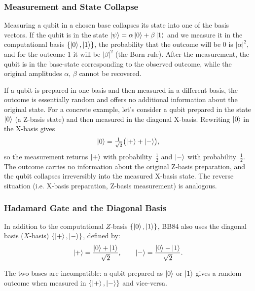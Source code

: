 \documentclass[12pt, a4paper]{article}
\begin{document}
\subsubsection{Measurement and State Collapse}

Measuring a qubit in a chosen base collapses its state into one of the basis vectors. If the qubit is in the state  $\ket{\psi} = \alpha\ket{0} + \beta\ket{1}$ and we measure it in the computational basis $\{\ket{0}, \ket{1}\}$, the probability that the outcome will be 0 is $|\alpha|^2$, and for the outcome 1 it will be $|\beta|^2$ (the Born rule). After the measurement, the qubit is in the base-state corresponding to the observed outcome, while the original amplitudes $\alpha$, $\beta$ cannot be recovered.

If a qubit is prepared in one basis and then measured in a
different basis, the outcome is essentially random and offers no
additional information about the original state. For a concrete
example, let's consider a qubit prepared in the state $\ket{0}$ (a
Z-basis state) and then measured in the diagonal X-basis.
Rewriting $\ket{0}$ in the X-basis gives
\begin{equation*}
  \ket{0} = \tfrac{1}{\sqrt{2}}\bigl(\ket{+} + \ket{-}\bigr),
\end{equation*}
so the measurement returns $\ket{+}$ with probability~$\tfrac{1}{2}$
and $\ket{-}$ with probability~$\tfrac{1}{2}$. The outcome carries
no information about the original Z-basis preparation, and the
qubit collapses irreversibly into the measured X-basis state.
The reverse situation (i.e. X-basis preparation, Z-basis
measurement) is analogous.

\subsubsection{Hadamard Gate and the Diagonal Basis}

In addition to the computational $Z$-basis $\{\ket{0},\ket{1}\}$, BB84 also uses the diagonal basis ($X$-basis) $\{\ket{+},\ket{-}\}$, defined by:
\begin{equation*}
  \ket{+} = \frac{\ket{0} + \ket{1}}{\sqrt{2}}, \qquad
  \ket{-} = \frac{\ket{0} - \ket{1}}{\sqrt{2}}.
  \label{eq:hadamard-states}
\end{equation*}

The two bases are incompatible: a qubit prepared as $\ket{0}$ or
$\ket{1}$ gives a random outcome when measured in $\{\ket{+}, \ket{-}\}$ and vice-versa.
\end{document}
